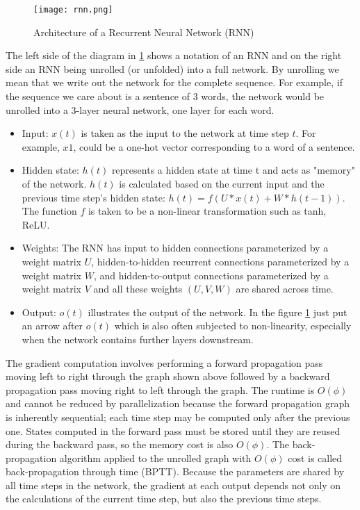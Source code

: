 \begin{figure}
	\centering
	\texttt{[image: rnn.png]}
	\caption{Architecture of a Recurrent Neural Network (RNN)}
	\label{fig:rnn}
\end{figure}


The left side of the diagram in \ref{fig:rnn} shows a notation of an RNN and on the right side an RNN being unrolled (or unfolded) into a full network. By unrolling we mean that we write out the network for the complete sequence. For example, if the sequence we care about is a sentence of 3 words, the network would be unrolled into a 3-layer neural network, one layer for each word.

\begin{itemize}
	\item Input: $x(t)$ is taken as the input to the network at time step $t$. For example, $x1$, could be a one-hot vector corresponding to a word of a sentence.
	\item Hidden state: $h(t)$ represents a hidden state at time t and acts as "memory" of the network. $h(t)$ is calculated based on the current input and the previous time step's hidden state: $h(t) = f(U * x(t) + W * h(t - 1))$. The function $f$ is taken to be a non-linear transformation such as tanh, ReLU.
	\item Weights: The RNN has input to hidden connections parameterized by a weight matrix $U$, hidden-to-hidden recurrent connections parameterized by a weight matrix $W$, and hidden-to-output connections parameterized by a weight matrix $V$ and all these weights $(U,V,W)$ are shared across time.
	\item Output: $o(t)$ illustrates the output of the network. In the figure \ref{fig:rnn} just put an arrow after $o(t)$ which is also often subjected to non-linearity, especially when the network contains further layers downstream.
\end{itemize}

The gradient computation involves performing a forward propagation pass moving left to right through the graph shown above followed by a backward propagation pass moving right to left through the graph. The runtime is $O(\phi)$ and cannot be reduced by parallelization because the forward propagation graph is inherently sequential; each time step may be computed only after the previous one. States computed in the forward pass must be stored until they are reused during the backward pass, so the memory cost is also $O(\phi)$. The back-propagation algorithm applied to the unrolled graph with $O(\phi)$ cost is called back-propagation through time (BPTT). Because the parameters are shared by all time steps in the network, the gradient at each output depends not only on the calculations of the current time step, but also the previous time steps.